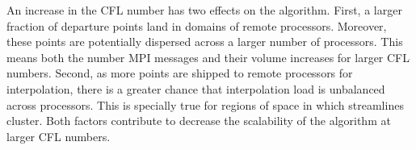 An increase in the CFL number has two effects on the algorithm. First, a larger fraction of departure points land in domains of remote processors. Moreover, these points are potentially dispersed across a larger number of processors. This means both the number MPI messages and their volume increases for larger CFL numbers. Second, as more points are shipped to remote processors for interpolation, there is a greater chance that interpolation load is unbalanced across processors. This is specially true for regions of space in which streamlines cluster. Both factors contribute to decrease the scalability of the algorithm at larger CFL numbers. 
\begin{figure}[htbp]
	\begin{center}
		\\

\end{center}
\end{figure}
